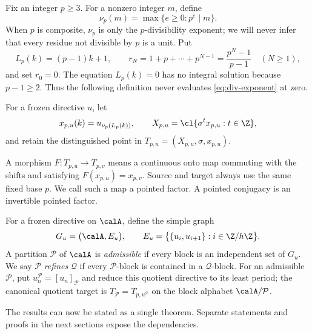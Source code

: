 Fix an integer $p\geq3$.  For a nonzero integer $m$, define
\begin{equation}
  \nu_p(m)=\max\{e\geq0:p^e\mid m\}.
  \label{eq:div-exponent}
\end{equation}
When $p$ is composite, $\nu_p$ is only the $p$-divisibility exponent; we
will never infer that every residue not divisible by $p$ is a unit.  Put
\begin{equation}
  L_p(k)=(p-1)k+1,
  \qquad
  r_N=1+p+\cdots+p^{N-1}=\frac{p^N-1}{p-1}\quad(N\geq1),
  \label{eq:L-r}
\end{equation}
and set $r_0=0$.  The equation $L_p(k)=0$ has no integral solution because
$p-1\geq2$.  Thus the following definition never evaluates \cref{eq:div-exponent}
at zero.

\begin{definition}
  For a frozen directive $u$, let
  \begin{equation}
    x_{p,u}(k)=u_{\nu_p(L_p(k))},\qquad
    X_{p,u}=\cl\{\sigma^t x_{p,u}:t\in\Z\},
    \label{eq:affine-system}
  \end{equation}
  and retain the distinguished point in
  $T_{p,u}=(X_{p,u},\sigma,x_{p,u})$.
\end{definition}

A morphism $F:T_{p,u}\to T_{p,v}$ means a continuous onto map commuting
with the shifts and satisfying $F(x_{p,u})=x_{p,v}$.  Source and target
always use the same fixed base $p$.  We call such a map a pointed factor.
A pointed conjugacy is an invertible pointed factor.

For a frozen directive on $\calA$, define the simple graph
\begin{equation}
  G_u=\bigl(\calA,E_u\bigr),
  \qquad
  E_u=\bigl\{\{u_i,u_{i+1}\}:i\in\Z/h\Z\bigr\}.
  \label{eq:adjacency-graph}
\end{equation}
A partition $\mathcal P$ of $\calA$ is \emph{admissible} if every block is
an independent set of $G_u$.  We say $\mathcal P$ \emph{refines}
$\mathcal Q$ if every $\mathcal P$-block is contained in a
$\mathcal Q$-block.
For an admissible $\mathcal P$, put
$u^{\mathcal P}_n=[u_n]_{\mathcal P}$ and reduce this quotient directive to
its least period; the canonical quotient target is
$T_{\mathcal P}=T_{p,u^{\mathcal P}}$ on the block alphabet
$\calA/\mathcal P$.

The results can now be stated as a single theorem.  Separate statements and
proofs in the next sections expose the dependencies.

